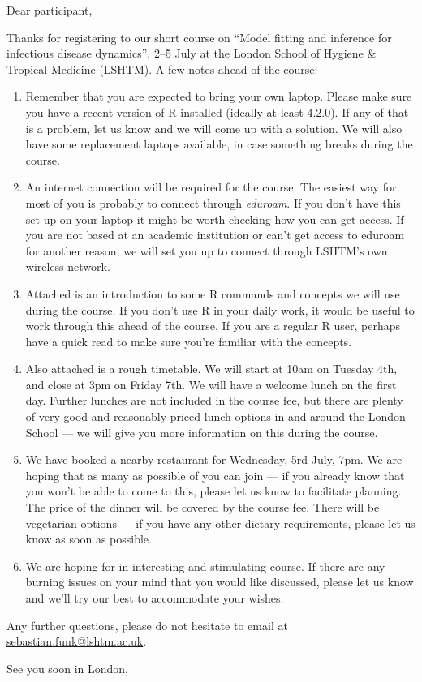\documentclass[paper=a4, 11pt]{scrlttr2}
\begin{document}
\begin{letter}{}
\opening{Dear participant,}
Thanks for registering to our short course on ``Model fitting and
inference for infectious disease dynamics'', 2--5 July at the London
School of Hygiene \& Tropical Medicine (LSHTM). A few notes ahead of
the course:

\begin{enumerate}
\item Remember that you are expected to bring your own laptop. Please make sure
  you have a recent version of R installed
(ideally at least 4.2.0). If any of that is a problem, let us know
and we will come up with a solution. We will also have some replacement laptops
available, in case something breaks during the course.
\item An internet connection will be required for the course. The easiest
way for most of you is probably to connect through \emph{eduroam}. If you
don't have this set up on your laptop it might be worth checking how you
can get access. If you are not based at an academic institution or can't
get access to eduroam for another reason, we will set you up to connect
through LSHTM's own wireless network.
\item Attached is an introduction to some R commands and concepts
we will use during the course. If you don't use R in your daily work, it
would be useful to work through this ahead of the course. If you are a
regular R user, perhaps have a quick read to 
make sure you're familiar with the concepts.
\item Also attached is a rough timetable. We will start at 10am on Tuesday 4th, and close at 3pm on Friday 7th. We will have a welcome lunch on the first day. Further lunches are not included in the course fee, but there are plenty of very good and reasonably priced lunch options in and around the London School --- we will give you more information on this during the course.
\item We have booked a nearby restaurant for Wednesday, 5rd July, 7pm. We are hoping that as many as possible of you
can join --- if you already know that you won't be able to come to this,
please let us know to facilitate planning. The price of the dinner will
be covered by the course fee. There will be vegetarian options --- if you
have any other dietary requirements, please let us know as soon as
possible.
\item We are hoping for in interesting and stimulating course. If there are
any burning issues on your mind that you would like discussed, please
let us know and we'll try our best to accommodate your wishes.
\end{enumerate}
Any further questions, please do not hesitate to email at \href{mailto:sebastian.funk@lshtm.ac.uk}{sebastian.funk@lshtm.ac.uk}.

\closing{See you soon in London,}
\end{letter}
\end{document}
